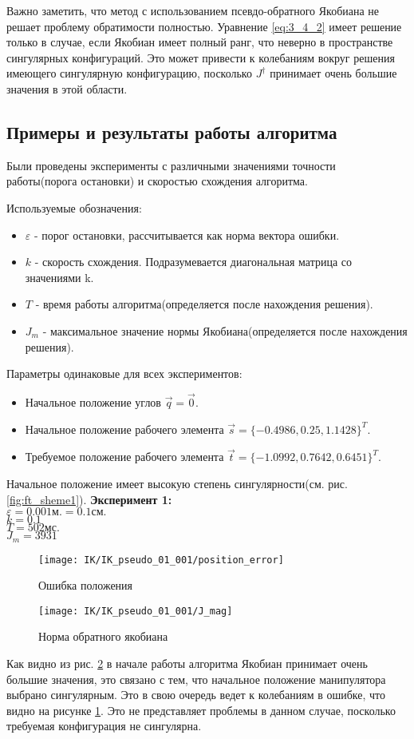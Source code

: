 Важно заметить, что метод с использованием псевдо-обратного Якобиана не решает проблему обратимости полностью. Уравнение \ref{eq:3_4_2} имеет решение только в случае, если Якобиан имеет полный ранг, что неверно в пространстве сингулярных конфигураций. Это может привести к колебаниям вокруг решения имеющего сингулярную конфигурацию, посколько $J^{\dagger}$ принимает очень большие значения в этой области. 

\subsection{Примеры и результаты работы алгоритма}\label{subsect:3_4_1}
	Были проведены эксперименты с различными значениями точности работы(порога остановки) и скоростью схождения алгоритма.
	
	Используемые обозначения:
	\begin{itemize}
		\item $\varepsilon$ - порог остановки, рассчитывается как норма вектора ошибки.
		\item $k$ - скорость схождения. Подразумевается диагональная матрица со значениями k.
		\item $T$ - время работы алгоритма(определяется после нахождения решения).
		\item $J_{m}$ - максимальное значение нормы Якобиана(определяется после нахождения решения).
	\end{itemize}
	\bigbreak
	Параметры одинаковые для всех экспериментов:
	\begin{itemize}
		\item 	Начальное положение углов $\vec{q} = \vec{0}$.
		\item	Начальное положение рабочего элемента $\vec{s} = \{-0.4986, 0.25, 1.1428\}^{T}$.
		\item	Требуемое положение рабочего элемента $\vec{t} = \{-1.0992, 0.7642, 0.6451\}^{T}$.
	\end{itemize}
	\bigbreak
	Начальное положение имеет высокую степень сингулярности(см. рис. \ref{fig:ft_sheme1}). 
 	\bigbreak
	\textbf{Эксперимент 1:}\\
		$\varepsilon = 0.001\text{м.} = 0.1\text{см.}$\\
		$k = 0.1$\\
		$T = 502 \text{мс.}$\\
		$J_{m} = 3931$
		
		\begin{figure}[h!]
			\centering
			\texttt{[image: IK/IK\_pseudo\_01\_001/position\_error]}
			\caption{Ошибка положения}
			\label{fig:3_4_1}
		\end{figure}
		\begin{figure}[h!]
			\centering
			\texttt{[image: IK/IK\_pseudo\_01\_001/J\_mag]}
			\caption{Норма обратного якобиана}
			\label{fig:3_4_2}
		\end{figure}
		Как видно из рис. \ref{fig:3_4_2} в начале работы алгоритма Якобиан принимает очень большие значения, это связано с тем, что начальное положение манипулятора выбрано сингулярным. Это в свою очередь ведет к колебаниям в ошибке, что видно на рисунке \ref{fig:3_4_1}. Это не представляет проблемы в данном случае, посколько требуемая конфигурация не сингулярна.
		
